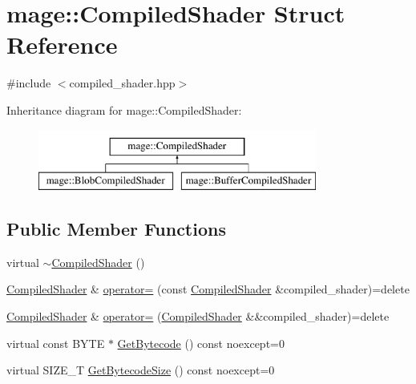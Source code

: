 \hypertarget{structmage_1_1_compiled_shader}{}\section{mage\+:\+:Compiled\+Shader Struct Reference}
\label{structmage_1_1_compiled_shader}


{\ttfamily \#include $<$compiled\+\_\+shader.\+hpp$>$}

Inheritance diagram for mage\+:\+:Compiled\+Shader\+:\begin{figure}[H]
\begin{center}
\leavevmode
\includegraphics[height=2.000000cm]{structmage_1_1_compiled_shader}
\end{center}
\end{figure}
\subsection*{Public Member Functions}
\begin{DoxyCompactItemize}
\item 
virtual \hyperlink{structmage_1_1_compiled_shader_a40805ed2bcd988824d130aeb07200f21}{$\sim$\+Compiled\+Shader} ()
\item 
\hyperlink{structmage_1_1_compiled_shader}{Compiled\+Shader} \& \hyperlink{structmage_1_1_compiled_shader_a0744c55c5847abe75b89b66ded5cda8b}{operator=} (const \hyperlink{structmage_1_1_compiled_shader}{Compiled\+Shader} \&compiled\+\_\+shader)=delete
\item 
\hyperlink{structmage_1_1_compiled_shader}{Compiled\+Shader} \& \hyperlink{structmage_1_1_compiled_shader_abaacfe0cbd94d14dde20d5ce2209c374}{operator=} (\hyperlink{structmage_1_1_compiled_shader}{Compiled\+Shader} \&\&compiled\+\_\+shader)=delete
\item 
virtual const B\+Y\+TE $\ast$ \hyperlink{structmage_1_1_compiled_shader_a3d7a58d568dc30e66ea7488f28911127}{Get\+Bytecode} () const noexcept=0
\item 
virtual S\+I\+Z\+E\+\_\+T \hyperlink{structmage_1_1_compiled_shader_ae9dbc3c205d54cc89b9b0746b76b157b}{Get\+Bytecode\+Size} () const noexcept=0
\end{DoxyCompactItemize}
